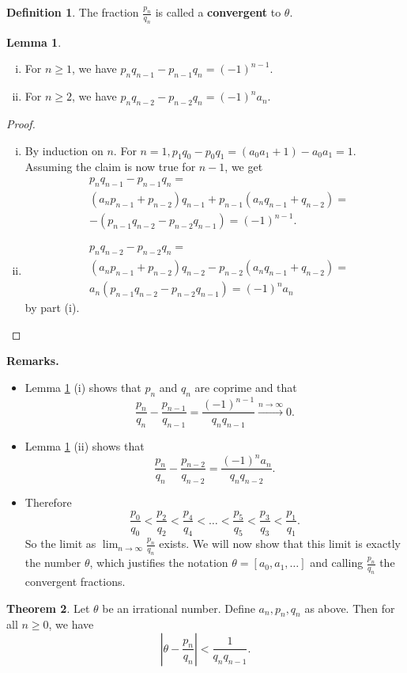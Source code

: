 \documentclass{article}
\theoremstyle{definition}
\newtheorem{theorem}{Theorem}[section]
\newtheorem{lemma}[theorem]{Lemma}
\newtheorem{defn}{Definition}[section]
\begin{document}
\begin{defn}
    The fraction $\frac{p_n}{q_n}$ is called a \textbf{convergent} to $\theta$.
\end{defn}
\begin{lemma}\label{6.3}
    \begin{enumerate}[(i)]
        \item For $n\ge 1$, we have $p_nq_{n-1}-p_{n-1}q_n = (-1)^{n-1}$.
        \item For $n\ge 2$, we have $p_nq_{n-2}-p_{n-2}q_n = (-1)^na_n$.
    \end{enumerate}
\end{lemma}
\begin{proof}
    \begin{enumerate}[(i)]
        \item By induction on $n$. For $n=1, p_1q_0-p_0q_1=(a_0a_1+1)-a_0a_1=1$.
        Assuming the claim is now true for $n-1$, we get 
        \begin{align*}
            &p_nq_{n-1}-p_{n-1}q_n =\\& (a_np_{n-1}+p_{n-2})q_{n-1}+p_{n-1}(a_nq_{n-1}+q_{n-2}) = \\
            &-(p_{n-1}q_{n-2}-p_{n-2}q_{n-1})=(-1)^{n-1}.
        \end{align*}
        \item
        \begin{align*}
            &p_nq_{n-2}-p_{n-2}q_n =\\& (a_np_{n-1}+p_{n-2})q_{n-2}-p_{n-2}(a_nq_{n-1}+q_{n-2}) =\\
            & a_n(p_{n-1}q_{n-2}-p_{n-2}q_{n-1}) =(-1)^na_n
        \end{align*}
        by part (i).
    \end{enumerate}
\end{proof}
\textbf{Remarks.}
\begin{itemize}
    \item Lemma \ref{6.3} (i) shows that $p_n$ and $q_n$ are coprime and that $$\frac{p_n}{q_n}-\frac{p_{n-1}}{q_{n-1}} = \frac{(-1)^{n-1}}{q_nq_{n-1}} \stackrel{n \to \infty}{\to} 0.$$
    \item Lemma \ref{6.3} (ii) shows that \[
    \frac{p_n}{q_n} - \frac{p_{n-2}}{q_{n-2}} = \frac{(-1)^na_n}{q_nq_{n-2}}.
    \]
    \item Therefore \[
    \frac{p_0}{q_0}<\frac{p_2}{q_2}<\frac{p_4}{q_4}<\ldots < \frac{p_5}{q_5}<\frac{p_3}{q_3}<\frac{p_1}{q_1}.
    \]
    So the limit as $\lim_{n \to \infty}\frac{p_n}{q_n}$ exists. We will now show that this limit is exactly the number $\theta$, which justifies the notation $\theta = [a_0,a_1,\ldots]$ and calling $\frac{p_n}{q_n}$ the convergent fractions.
\end{itemize} 
\begin{theorem}
    Let $\theta$ be an irrational number. Define $a_n,p_n,q_n$ as above. Then for all $n\ge 0$, we have
    \[
    \left|\theta - \frac{p_n}{q_n}\right| < \frac{1}{q_nq_{n-1}}.
    \]
\end{theorem}
\end{document}
